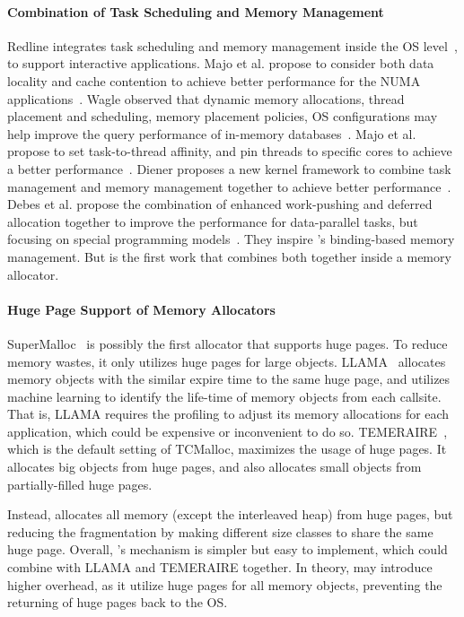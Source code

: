\paragraph{Combination of Task Scheduling and Memory Management} Redline integrates task scheduling and memory management inside the OS level~\cite{Redline}, to support interactive applications. 
Majo et al. propose to consider both data locality and cache contention to achieve better performance for the NUMA applications~\cite{Majo:2011:MMN:1993478.1993481}. Wagle observed that dynamic memory allocations, thread placement and scheduling, memory placement policies, OS configurations may help improve the query performance of in-memory databases~\cite{wagle2015numa}.  Majo et al. propose to set task-to-thread affinity, and pin threads to specific cores to achieve a better performance~\cite{Majo:2015:LPC:2688500.2688509}. Diener proposes a new kernel framework to combine task management and memory management together to achieve better performance~\cite{diener2015automatic}. 
Debes et al. propose the combination of enhanced work-pushing and deferred allocation together to improve the performance for data-parallel tasks, but focusing on special programming models~\cite{DBLP:conf/IEEEpact/DrebesPH0D16}. They inspire \NM{}'s binding-based memory management. But \NM{} is the first work that combines both together inside a memory allocator. 

\paragraph{Huge Page Support of Memory Allocators}
SuperMalloc~\cite{supermalloc} is possibly the first allocator that supports huge pages. To reduce memory wastes, it only utilizes huge pages for large objects. LLAMA~\cite{LLAMA} allocates memory objects with the similar expire time to the same huge page, and utilizes machine learning to identify the life-time of memory objects from each callsite. That is, LLAMA requires the profiling to adjust its memory allocations for each application, which could be expensive or inconvenient to do so.  TEMERAIRE~\cite{TEMERAIRE}, which is the default setting of TCMalloc, maximizes the usage of huge pages. It allocates big objects from huge pages, and also allocates small objects from partially-filled huge pages.     

Instead, \NM{} allocates all memory (except the interleaved heap) from huge pages,  but reducing the fragmentation by making different size classes to share the same huge page. Overall, \NM{}'s mechanism is simpler but easy to implement, which could combine with LLAMA and TEMERAIRE together. In theory, \NM{} may introduce higher overhead, as it utilize huge pages for all memory objects, preventing the returning of huge pages back to the OS. 



